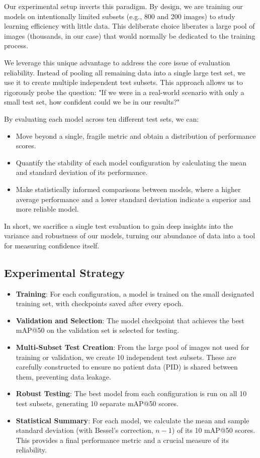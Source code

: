 Our experimental setup inverts this paradigm. By design, we are training our models on intentionally limited subsets (e.g., 800 and 200 images) to study learning efficiency with little data. This deliberate choice liberates a large pool of images (thousands, in our case) that would normally be dedicated to the training process.

We leverage this unique advantage to address the core issue of evaluation reliability. Instead of pooling all remaining data into a single large test set, we use it to create multiple independent test subsets. This approach allows us to rigorously probe the question: "If we were in a real-world scenario with only a small test set, how confident could we be in our results?"

By evaluating each model across ten different test sets, we can:

\begin{itemize}
    \item Move beyond a single, fragile metric and obtain a distribution of performance scores.
    \item Quantify the stability of each model configuration by calculating the mean and standard deviation of its performance.
    \item Make statistically informed comparisons between models, where a higher average performance and a lower standard deviation indicate a superior and more reliable model.
\end{itemize}

In short, we sacrifice a single test evaluation to gain deep insights into the variance and robustness of our models, turning our abundance of data into a tool for measuring confidence itself.

\subsection*{Experimental Strategy}

\begin{itemize}
\item \textbf{Training}: For each configuration, a model is trained on the small designated training set, with checkpoints saved after every epoch.
\item \textbf{Validation and Selection}: The model checkpoint that achieves the best mAP@50 on the validation set is selected for testing.
\item \textbf{Multi-Subset Test Creation}: From the large pool of images not used for training or validation, we create 10 independent test subsets. These are carefully constructed to ensure no patient data (PID) is shared between them, preventing data leakage.
\item \textbf{Robust Testing}: The best model from each configuration is run on all 10 test subsets, generating 10 separate mAP@50 scores.
\item \textbf{Statistical Summary}: For each model, we calculate the mean and sample standard deviation (with Bessel's correction, $n-1$) of its 10 mAP@50 scores. This provides a final performance metric and a crucial measure of its reliability.
\end{itemize}
 
